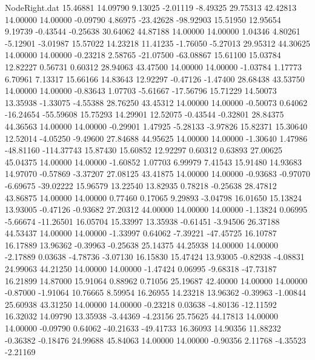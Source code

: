 \begin{filecontents}{NodeRight.dat}
  15.46881   14.09790    9.13025    -2.01119   -8.49325   29.75313   42.42813   14.00000   14.00000   -0.09790    4.86975  -23.42628  -98.92903
  15.51950   12.95654    9.19739    -0.43544   -0.25638   30.64062   44.87188   14.00000   14.00000    1.04346    4.80261   -5.12901   -3.01987
  15.57022   14.23218   11.41235    -1.76050   -5.27013   29.95312   44.30625   14.00000   14.00000   -0.23218    2.58765  -21.07500  -63.08867
  15.61100   15.03784   12.82227     0.56731    0.60312   28.94063   43.47500   14.00000   14.00000   -1.03784    1.17773    6.70961    7.13317
  15.66166   14.83643   12.92297    -0.47126   -1.47400   28.68438   43.53750   14.00000   14.00000   -0.83643    1.07703   -5.61667  -17.56796
  15.71229   14.50073   13.35938    -1.33075   -4.55388   28.76250   43.45312   14.00000   14.00000   -0.50073    0.64062  -16.24654  -55.59608
  15.75293   14.29901   12.52075    -0.43544   -0.32801   28.84375   44.36563   14.00000   14.00000   -0.29901    1.47925   -5.28133   -3.97826
  15.82371   15.30640   12.52014    -4.05250   -9.49600   27.84688   44.95625   14.00000   14.00000   -1.30640    1.47986  -48.81160 -114.37743
  15.87430   15.60852   12.92297     0.60312    0.63893   27.00625   45.04375   14.00000   14.00000   -1.60852    1.07703    6.99979    7.41543
  15.91480   14.93683   14.97070    -0.57869   -3.37207   27.08125   43.41875   14.00000   14.00000   -0.93683   -0.97070   -6.69675  -39.02222
  15.96579   13.22540   13.82935     0.78218   -0.25638   28.47812   43.86875   14.00000   14.00000    0.77460    0.17065    9.29893   -3.04798
  16.01650   15.13824   13.93005    -0.47126   -0.93682   27.20312   44.00000   14.00000   14.00000   -1.13824    0.06995   -5.66674  -11.26501
  16.05704   15.33997   13.35938    -0.61451   -3.94506   26.37188   44.53437   14.00000   14.00000   -1.33997    0.64062   -7.39221  -47.45725
  16.10787   16.17889   13.96362    -0.39963   -0.25638   25.14375   44.25938   14.00000   14.00000   -2.17889    0.03638   -4.78736   -3.07130
  16.15830   15.47424   13.93005    -0.82938   -4.08831   24.99063   44.21250   14.00000   14.00000   -1.47424    0.06995   -9.68318  -47.73187
  16.21899   14.87000   15.91064     0.88962    0.71056   25.19687   42.40000   14.00000   14.00000   -0.87000   -1.91064   10.76665    8.59954
  16.26955   14.23218   13.96362    -0.39963   -1.00844   25.60938   43.31250   14.00000   14.00000   -0.23218    0.03638   -4.80136  -12.11592
  16.32032   14.09790   13.35938    -3.44369   -4.23156   25.75625   44.17813   14.00000   14.00000   -0.09790    0.64062  -40.21633  -49.41733
  16.36093   14.90356   11.88232    -0.36382   -0.18476   24.99688   45.84063   14.00000   14.00000   -0.90356    2.11768   -4.35523   -2.21169

\end{filecontents}
